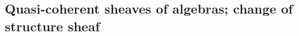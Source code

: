 \documentclass[../main.tex]{subfiles}
\begin{document}
\subsection{Quasi-coherent sheaves of algebras; change of structure sheaf}
\end{document}
